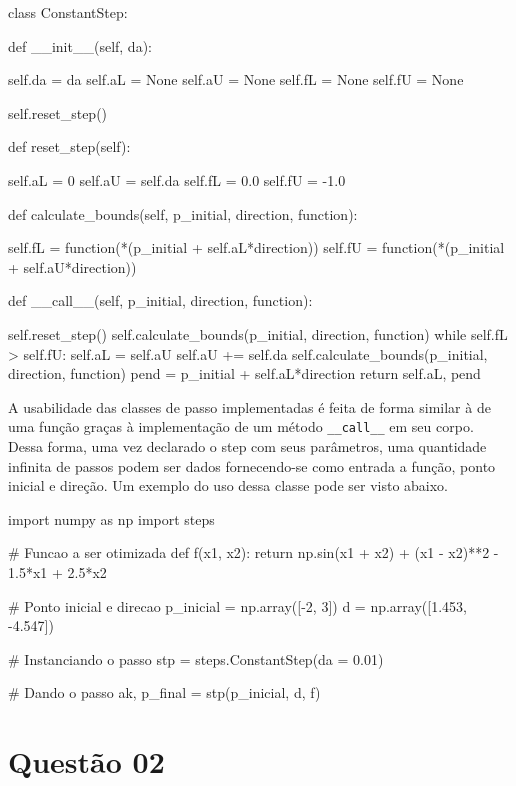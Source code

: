 \documentclass[10pt, a4paper]{article}
\begin{document}
\begin{python}
class ConstantStep:
    
    def __init__(self, da):

        self.da = da
        self.aL = None
        self.aU = None
        self.fL = None
        self.fU = None

        self.reset_step()

    def reset_step(self):

        self.aL = 0
        self.aU = self.da
        self.fL =  0.0
        self.fU = -1.0

    def calculate_bounds(self, p_initial, direction, function):

        self.fL = function(*(p_initial + self.aL*direction))
        self.fU = function(*(p_initial + self.aU*direction))

    def __call__(self, p_initial, direction, function):
        
        self.reset_step()
        self.calculate_bounds(p_initial, direction, function)
        while self.fL > self.fU:
            self.aL = self.aU
            self.aU += self.da
            self.calculate_bounds(p_initial, direction, function)
        pend = p_initial + self.aL*direction
        return self.aL, pend
\end{python}

A usabilidade das classes de passo implementadas é feita de forma similar à de uma função graças à implementação de um método {\tt \_\_call\_\_}
em seu corpo. Dessa forma, uma vez declarado o step com seus parâmetros, uma quantidade infinita de passos podem ser dados fornecendo-se como
entrada a função, ponto inicial e direção. Um exemplo do uso dessa classe pode ser visto abaixo.

\begin{python}
import numpy as np
import steps

# Funcao a ser otimizada
def f(x1, x2):
    return np.sin(x1 + x2) + (x1 - x2)**2 - 1.5*x1 + 2.5*x2

# Ponto inicial e direcao
p_inicial = np.array([-2, 3])
d = np.array([1.453, -4.547])

# Instanciando o passo
stp = steps.ConstantStep(da = 0.01)

# Dando o passo
ak, p_final = stp(p_inicial, d, f)
\end{python}

\newpage
\section{Questão 02}
\end{document}
